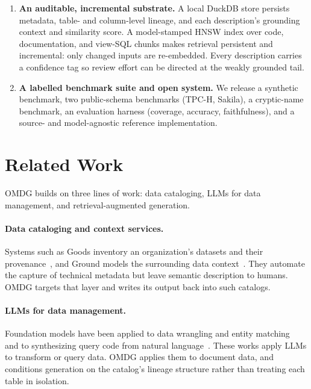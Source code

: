 \begin{enumerate}
  when the targets are met or no strategy yields further improvement.
  \item \textbf{An auditable, incremental substrate.} A local DuckDB store persists
  metadata, table- and column-level lineage, and each description's grounding context and
  similarity score. A model-stamped HNSW index over code, documentation, and view-SQL
  chunks makes retrieval persistent and incremental: only changed inputs are re-embedded.
  Every description carries a confidence tag so review effort can be directed at the weakly
  grounded tail.
  \item \textbf{A labelled benchmark suite and open system.} We release a synthetic
  benchmark, two public-schema benchmarks (TPC-H, Sakila), a cryptic-name benchmark, an
  evaluation harness (coverage, accuracy, faithfulness), and a source- and model-agnostic
  reference implementation.
\end{enumerate}

\section{Related Work}
OMDG builds on three lines of work: data cataloging, LLMs for data management, and
retrieval-augmented generation.

\paragraph{Data cataloging and context services.} Systems such as Goods inventory an
organization's datasets and their provenance~\citep{halevy2016goods}, and Ground models the
surrounding data context~\citep{hellerstein2017ground}. They automate the capture of
technical metadata but leave semantic description to humans. OMDG targets that layer and
writes its output back into such catalogs.

\paragraph{LLMs for data management.} Foundation models have been applied to data wrangling
and entity matching~\citep{narayan2022foundation} and to synthesizing query code from
natural language~\citep{trummer2022codexdb}. These works apply LLMs to transform or query
data. OMDG applies them to document data, and conditions generation on the catalog's
lineage structure rather than treating each table in isolation.

